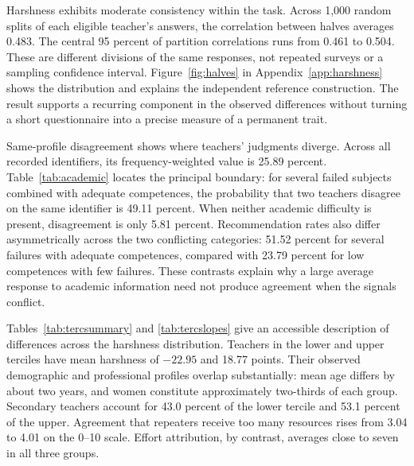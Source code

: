 Harshness exhibits moderate consistency within the task. Across 1,000 random splits of each eligible teacher's answers, the correlation between halves averages 0.483. The central 95 percent of partition correlations runs from 0.461 to 0.504. These are different divisions of the same responses, not repeated surveys or a sampling confidence interval. Figure~\ref{fig:halves} in Appendix~\ref{app:harshness} shows the distribution and explains the independent reference construction. The result supports a recurring component in the observed differences without turning a short questionnaire into a precise measure of a permanent trait.

Same-profile disagreement shows where teachers' judgments diverge. Across all recorded identifiers, its frequency-weighted value is 25.89 percent. Table~\ref{tab:academic} locates the principal boundary: for several failed subjects combined with adequate competences, the probability that two teachers disagree on the same identifier is 49.11 percent. When neither academic difficulty is present, disagreement is only 5.81 percent. Recommendation rates also differ asymmetrically across the two conflicting categories: 51.52 percent for several failures with adequate competences, compared with 23.79 percent for low competences with few failures. These contrasts explain why a large average response to academic information need not produce agreement when the signals conflict.

Tables~\ref{tab:tercsummary} and \ref{tab:tercslopes} give an accessible description of differences across the harshness distribution. Teachers in the lower and upper terciles have mean harshness of $-22.95$ and 18.77 points. Their observed demographic and professional profiles overlap substantially: mean age differs by about two years, and women constitute approximately two-thirds of each group. Secondary teachers account for 43.0 percent of the lower tercile and 53.1 percent of the upper. Agreement that repeaters receive too many resources rises from 3.04 to 4.01 on the 0--10 scale. Effort attribution, by contrast, averages close to seven in all three groups.

